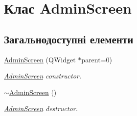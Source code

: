 \hypertarget{classAdminScreen}{\section{Клас Admin\-Screen}
\label{classAdminScreen}
}
\subsection*{Загальнодоступні елементи}
\begin{DoxyCompactItemize}
\item 
\hyperlink{classAdminScreen_afacdce9a29c025265097914529ff5619}{Admin\-Screen} (Q\-Widget $\ast$parent=0)
\begin{DoxyCompactList}\small\item\em \hyperlink{classAdminScreen}{Admin\-Screen} constructor. \end{DoxyCompactList}\item 
\hypertarget{classAdminScreen_afaf1ed51e4a07af841c11f0f354ad2ed}{\hyperlink{classAdminScreen_afaf1ed51e4a07af841c11f0f354ad2ed}{$\sim$\-Admin\-Screen} ()}\label{classAdminScreen_afaf1ed51e4a07af841c11f0f354ad2ed}

\begin{DoxyCompactList}\small\item\em \hyperlink{classAdminScreen}{Admin\-Screen} destructor. \end{DoxyCompactList}\end{DoxyCompactItemize}
